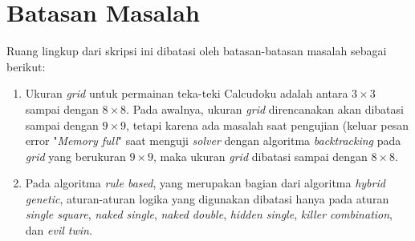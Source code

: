 \section{Batasan Masalah}
\label{sec:batasan}
Ruang lingkup dari skripsi ini dibatasi oleh batasan-batasan masalah sebagai berikut:
\begin{enumerate}
\item Ukuran \textit{grid} untuk permainan teka-teki Calcudoku adalah antara \begin{math}3 \times 3\end{math} sampai dengan \begin{math}8 \times 8\end{math}. Pada awalnya, ukuran \textit{grid} direncanakan akan dibatasi sampai dengan \begin{math}9 \times 9\end{math}, tetapi karena ada masalah saat pengujian (keluar pesan error "\textit{Memory full}" saat menguji \textit{solver} dengan algoritma \textit{backtracking} pada \textit{grid} yang berukuran \begin{math}9 \times 9\end{math}, maka ukuran \textit{grid} dibatasi sampai dengan \begin{math}8 \times 8\end{math}.
\item Pada algoritma \textit{rule based}, yang merupakan bagian dari algoritma \textit{hybrid genetic}, aturan-aturan logika yang digunakan dibatasi hanya pada aturan \textit{single square}, \textit{naked single}, \textit{naked double}, \textit{hidden single}, \textit{killer combination}, dan \textit{evil twin}.
\end{enumerate}

